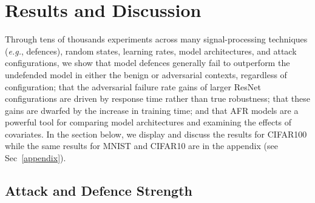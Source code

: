\section{Results and Discussion}
\label{results}

Through tens of thousands experiments across many signal-processing techniques (\textit{e.g.}, defences), random states, learning rates, model architectures, and attack configurations, we show that model defences generally fail to outperform the undefended model in either the benign or adversarial contexts, regardless of configuration; that the adversarial failure rate gains of larger ResNet configurations are driven by response time rather than true robustness; that these gains are dwarfed by the increase in training time; and that AFR models are a powerful tool for comparing model architectures and examining the effects of covariates. In the section below, we display and discuss the results for CIFAR100 while the same results for MNIST and CIFAR10 are in the appendix (see Sec~\ref{appendix}).



\subsection{Attack and Defence Strength}



